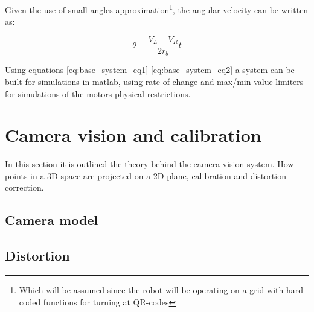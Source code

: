 Given the use of small-angles approximation\footnote{Which will be assumed since the robot will be operating on a grid with hard coded functions for turning at QR-codes}, the angular velocity can be written as:

\begin{equation}
    \theta = \frac{V_L-V_R}{2r_{b}}t
\end{equation}


\noindent Using equations \eqref{eq:base_system_eq1}-\eqref{eq:base_system_eq2} a system can be built for simulations in matlab, using rate of change and max/min value limiters for simulations of the motors physical restrictions.



\section*{Camera vision and calibration}
In this section it is outlined the theory behind the camera vision system. 
How points in a 3D-space are projected on a 2D-plane, calibration and distortion correction. 
\subsection*{Camera model}
\subsection*{Distortion}
